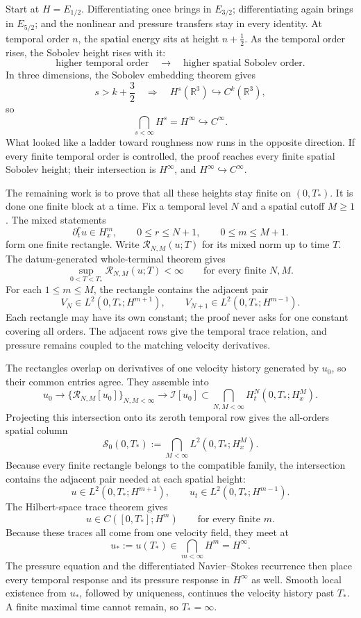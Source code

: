 \documentclass[11pt]{article}
\begin{document}
Start at \(H=E_{1/2}\). Differentiating once brings in \(E_{3/2}\); differentiating again brings in \(E_{5/2}\); and the nonlinear and pressure transfers stay in every identity. At temporal order \(n\), the spatial energy sits at height \(n+\tfrac12\). As the temporal order rises, the Sobolev height rises with it:
\[
\text{higher temporal order}
\quad\longrightarrow\quad
\text{higher spatial Sobolev order}.
\]
In three dimensions, the Sobolev embedding theorem gives
\[
s>k+\frac32
\quad\Longrightarrow\quad
H^s(\mathbb R^3)\hookrightarrow C^k(\mathbb R^3),
\]
so
\[
\bigcap_{s<\infty}H^s
=H^\infty
\hookrightarrow C^\infty.
\]
What looked like a ladder toward roughness now runs in the opposite direction. If every finite temporal order is controlled, the proof reaches every finite spatial Sobolev height; their intersection is \(H^\infty\), and \(H^\infty\hookrightarrow C^\infty\).

The remaining work is to prove that all these heights stay finite on \((0,T_*)\). It is done one finite block at a time. Fix a temporal level \(N\) and a spatial cutoff \(M\geq1\). The mixed statements
\[
\partial_t^ru\in H_x^m,
\qquad 0\leq r\leq N+1,
\qquad 0\leq m\leq M+1.
\]
form one finite rectangle. Write \(\mathcal R_{N,M}(u;T)\) for its mixed norm up to time \(T\). The datum-generated whole-terminal theorem gives
\[
\sup_{0<T<T_*}\mathcal R_{N,M}(u;T)<\infty
\qquad\text{for every finite }N,M.
\]
For each \(1\leq m\leq M\), the rectangle contains the adjacent pair
\[
V_N\in L^2(0,T_*;H^{m+1}),
\qquad
V_{N+1}\in L^2(0,T_*;H^{m-1}).
\]
Each rectangle may have its own constant; the proof never asks for one constant covering all orders. The adjacent rows give the temporal trace relation, and pressure remains coupled to the matching velocity derivatives.

The rectangles overlap on derivatives of one velocity history generated by \(u_0\), so their common entries agree. They assemble into
\[
u_0
\longrightarrow
\{\mathcal R_{N,M}[u_0]\}_{N,M<\infty}
\longrightarrow
\mathcal I[u_0]
\subset
\bigcap_{N,M<\infty}H_t^N(0,T_*;H_x^M).
\]
Projecting this intersection onto its zeroth temporal row gives the all-orders spatial column
\[
\mathscr S_0(0,T_*)
:=
\bigcap_{M<\infty}L^2(0,T_*;H_x^M).
\]
Because every finite rectangle belongs to the compatible family, the intersection contains the adjacent pair needed at each spatial height:
\[
u\in L^2(0,T_*;H^{m+1}),
\qquad
u_t\in L^2(0,T_*;H^{m-1}).
\]
The Hilbert-space trace theorem gives
\[
u\in C([0,T_*];H^m)
\qquad\text{for every finite }m.
\]
Because these traces all come from one velocity field, they meet at
\[
u_*:=u(T_*)\in\bigcap_{m<\infty}H^m=H^\infty.
\]
The pressure equation and the differentiated Navier--Stokes recurrence then place every temporal response and its pressure response in \(H^\infty\) as well. Smooth local existence from \(u_*\), followed by uniqueness, continues the velocity history past \(T_*\). A finite maximal time cannot remain, so \(T_*=\infty\).
\end{document}
